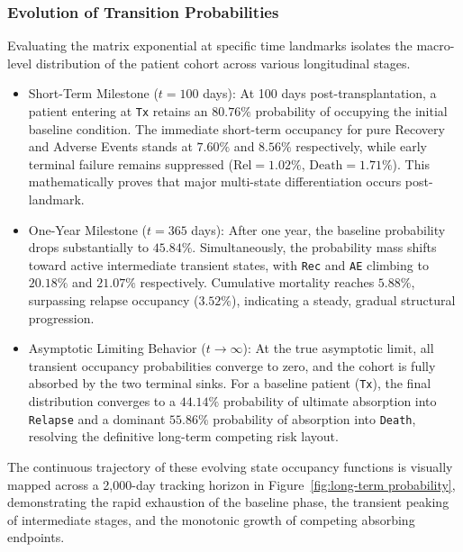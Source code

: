 \documentclass[9pt,a4paper,twocolumn,twoside]{rho-class/rho}
\begin{document}
        \subsubsection{Evolution of Transition Probabilities}
            Evaluating the matrix exponential at specific time landmarks isolates the macro-level distribution of the patient cohort across various longitudinal stages.
            \begin{itemize}
                \item Short-Term Milestone ($t=100$ days): At 100 days post-transplantation, a patient entering at \texttt{Tx} retains an $80.76\%$ probability of occupying the initial baseline condition. The immediate short-term occupancy for pure Recovery and Adverse Events stands at $7.60\%$ and $8.56\%$ respectively, while early terminal failure remains suppressed ($\text{Rel}=1.02\%$, $\text{Death}=1.71\%$). This mathematically proves that major multi-state differentiation occurs post-landmark.
                
                \item One-Year Milestone ($t=365$ days): After one year, the baseline probability drops substantially to $45.84\%$. Simultaneously, the probability mass shifts toward active intermediate transient states, with \texttt{Rec} and \texttt{AE} climbing to $20.18\%$ and $21.07\%$ respectively. Cumulative mortality reaches $5.88\%$, surpassing relapse occupancy ($3.52\%$), indicating a steady, gradual structural progression.
                
                \item Asymptotic Limiting Behavior ($t\rightarrow\infty$): At the true asymptotic limit, all transient occupancy probabilities converge to zero, and the cohort is fully absorbed by the two terminal sinks. For a baseline patient (\texttt{Tx}), the final distribution converges to a $44.14\%$ probability of ultimate absorption into \texttt{Relapse} and a dominant $55.86\%$ probability of absorption into \texttt{Death}, resolving the definitive long-term competing risk layout.
            \end{itemize}

            The continuous trajectory of these evolving state occupancy functions is visually mapped across a 2,000-day tracking horizon in Figure~\ref{fig:long-term probability}, demonstrating the rapid exhaustion of the baseline phase, the transient peaking of intermediate stages, and the monotonic growth of competing absorbing endpoints.
\end{document}
